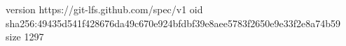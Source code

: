 version https://git-lfs.github.com/spec/v1
oid sha256:49435d541f428676da49c670e924bfdbf39e8aee5783f2650e9e33f2e8a74b59
size 1297
